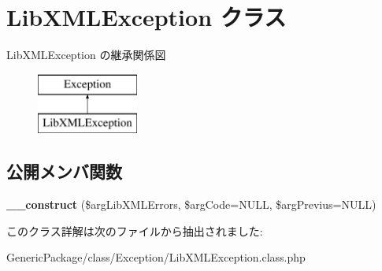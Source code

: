 \hypertarget{class_lib_x_m_l_exception}{}\section{Lib\+X\+M\+L\+Exception クラス}
\label{class_lib_x_m_l_exception}
Lib\+X\+M\+L\+Exception の継承関係図\begin{figure}[H]
\begin{center}
\leavevmode
\includegraphics[height=2.000000cm]{class_lib_x_m_l_exception}
\end{center}
\end{figure}
\subsection*{公開メンバ関数}
\begin{DoxyCompactItemize}
\item 
\hypertarget{class_lib_x_m_l_exception_ab39c6f0b2de0f7c0320f7f0e4d127895}{}{\bfseries \+\_\+\+\_\+construct} (\$arg\+Lib\+X\+M\+L\+Errors, \$arg\+Code=N\+U\+L\+L, \$arg\+Previus=N\+U\+L\+L)\label{class_lib_x_m_l_exception_ab39c6f0b2de0f7c0320f7f0e4d127895}

\end{DoxyCompactItemize}


このクラス詳解は次のファイルから抽出されました\+:\begin{DoxyCompactItemize}
\item 
Generic\+Package/class/\+Exception/Lib\+X\+M\+L\+Exception.\+class.\+php\end{DoxyCompactItemize}
